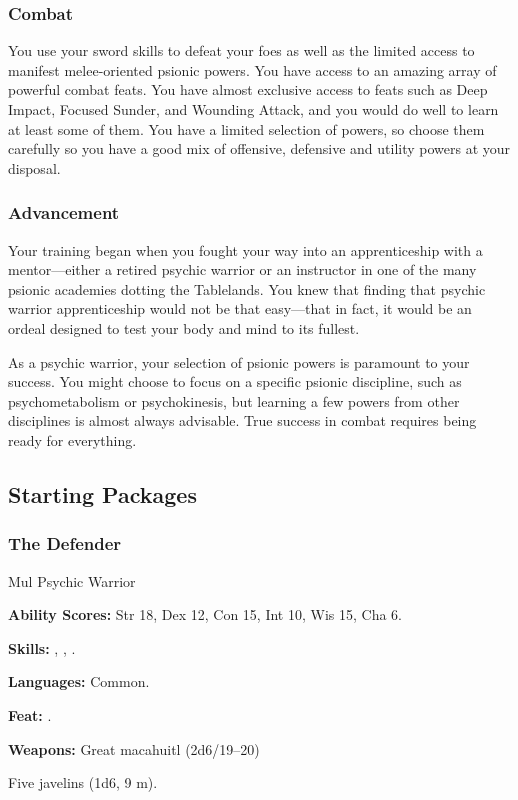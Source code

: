 \subsubsection{Combat}
You use your sword skills to defeat your foes as well as the limited access to manifest melee-oriented psionic powers. You have access to an amazing array of powerful combat feats. You have almost exclusive access to feats such as Deep Impact, Focused Sunder, and Wounding Attack, and you would do well to learn at least some of them. You have a limited selection of powers, so choose them carefully so you have a good mix of offensive, defensive and utility powers at your disposal.

\subsubsection{Advancement}
Your training began when you fought your way into an apprenticeship with a mentor---either a retired psychic warrior or an instructor in one of the many psionic academies dotting the Tablelands. You knew that finding that psychic warrior apprenticeship would not be that easy---that in fact, it would be an ordeal designed to test your body and mind to its fullest.

As a psychic warrior, your selection of psionic powers is paramount to your success. You might choose to focus on a specific psionic discipline, such as psychometabolism or psychokinesis, but learning a few powers from other disciplines is almost always advisable. True success in combat requires being ready for everything.

\vskip4cm
\subsection{Starting Packages}
\subsubsection{The Defender}
Mul Psychic Warrior

\textbf{Ability Scores:} Str 18, Dex 12, Con 15, Int 10, Wis 15, Cha 6.

\textbf{Skills:} , , .

\textbf{Languages:} Common.

\textbf{Feat:} .

\textbf{Weapons:} Great macahuitl (2d6/19--20)

Five javelins (1d6, 9 m).

